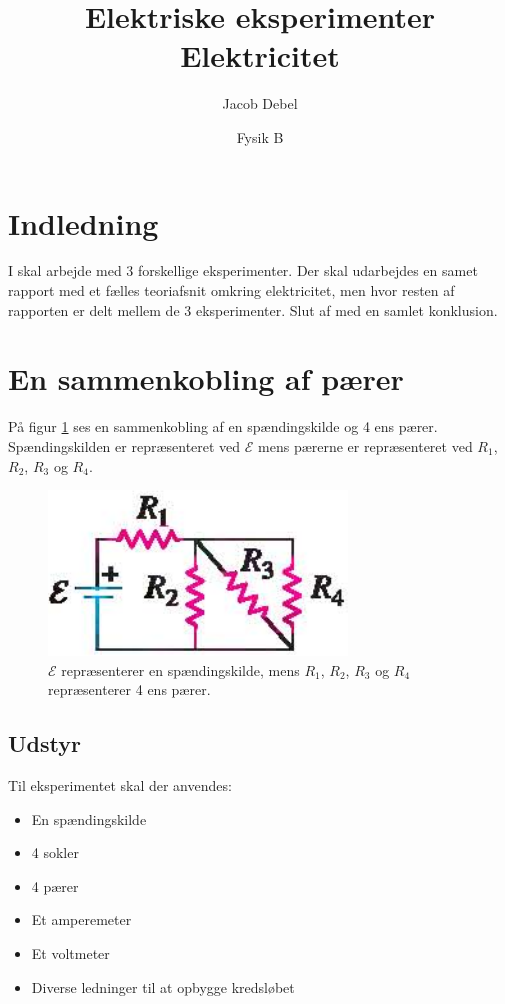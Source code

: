 \documentclass[a4paper, 12pt]{article}
\author{Jacob Debel}
\date{Fysik B}
\title{Elektriske eksperimenter\\\medskip
\large Elektricitet}
\begin{document}
\maketitle

\section*{Indledning}
\label{sec:org8655e6f}
I skal arbejde med 3 forskellige eksperimenter. Der skal udarbejdes en samet rapport med et fælles teoriafsnit omkring elektricitet, men hvor resten af rapporten er delt mellem de 3 eksperimenter. Slut af med en samlet konklusion.

\tableofcontents

\newpage


\section{En sammenkobling af pærer}
\label{sec:orga16d5f9}

På figur \ref{forsoeg_1} ses en sammenkobling af en spændingskilde og 4 ens pærer. Spændingskilden er repræsenteret ved \(\mathcal{E}\) mens pærerne er repræsenteret ved \(R_1\), \(R_2\), \(R_3\) og \(R_4\).

\begin{figure}[htbp]
\centering
\includegraphics[width=0.4\linewidth]{./img/forsoeg_1.png}
\caption{\label{forsoeg_1}\(\mathcal{E}\) repræsenterer en spændingskilde, mens \(R_1\), \(R_2\), \(R_3\) og \(R_4\) repræsenterer 4 ens pærer.}
\end{figure}

\subsection{Udstyr}
\label{sec:org7d83717}

Til eksperimentet skal der anvendes:

\begin{itemize}[noitemsep]
\item En spændingskilde
\item 4 sokler
\item 4 pærer
\item Et amperemeter
\item Et voltmeter
\item Diverse ledninger til at opbygge kredsløbet
\end{itemize}
\end{document}
